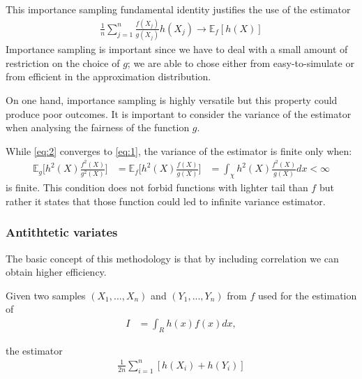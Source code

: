 \documentclass[paper=a4, fontsize=12pt]{scrartcl} %
\numberwithin{equation}{section}
\begin{document}
This importance sampling fundamental identity justifies the use of the estimator
		\begin{equation}	\label{q:2}
		\begin{aligned}
			\frac{1}{n}  \sum_{j=1}^{n} \frac{f(X_j)}{g(X_j)} h(X_j) \rightarrow \mathbb{E}_f [h(X)]
		\end{aligned}
		\end{equation}
Importance sampling is important since we have to deal with a small amount of restriction on the choice of $g$; we are able to chose either from easy-to-simulate or from efficient in the approximation distribution.	\par
On one hand, importance sampling is highly versatile but this property could produce poor outcomes. It is important to consider the variance of the estimator when analysing the fairness of the function $g$. \par
While \ref{eq:2} converges to \ref{eq:1}, the variance of the estimator is finite only when:
	\begin{equation}
	\begin{aligned}
		\mathbb{E}_g \bigg[h^2(X) \frac{f^2(X)}{g^2(X)} \bigg] &= \mathbb{E}_f \bigg[h^2(X) \frac{f(X)}{g(X)} \bigg] 	
		&= \int_\chi h^2(X) \frac{f^2(X)}{g(X)} dx < \infty
	\end{aligned}
	\end{equation} 
is finite. This condition does not forbid functions with lighter tail than $f$ but rather it states that those function could led to infinite variance estimator.

\subsubsection{Antithtetic variates}
The basic concept of this methodology is that by including correlation we can obtain higher efficiency. \par

Given two samples $(X_1, ..., X_n)$ and $(Y_1, ..., Y_n)$ from $f$ used for the estimation of
		\begin{equation}	
		\begin{aligned}
			I &= \int_R h(x)f(x)dx,
		\end{aligned}
		\end{equation}

the estimator
		\begin{equation}	
		\begin{aligned}
			\frac{1}{2n} \sum_{i=1}^{n} [h(X_i) + h(Y_i)]
		\end{aligned}
		\end{equation}
\end{document}
